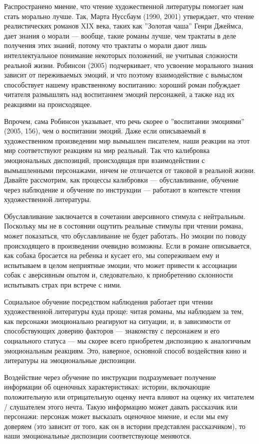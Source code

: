 \documentclass[11pt]{book}
\begin{document}
Распространено мнение, что чтение художественной литературы помогает нам стать морально лучше. Так, Марта Нуссбаум (1990, 2001) утверждает, что чтение реалистических романов XIX века, таких как ''Золотая чаша'' Генри Джеймса, дает знания о морали --- вообще, такие романы лучше, чем трактаты в деле получения этих знаний, потому что трактаты о морали дают лишь интеллектуальное понимание некоторых положений, не учитывая сложности реальной жизни. Робинсон (2005) подчеркивает, что усвоение морального знания зависит от переживаемых эмоций, и что поэтому взаимодействие с вымыслом способствует нашему нравственному воспитанию: хороший роман побуждает читателя размышлять над воспитанием эмоций персонажей, а также над их реакциями на происходящее.

Впрочем, сама Робинсон указывает, что речь скорее о ''воспитании эмоциями'' (2005, 156), чем о воспитании эмоций. Даже если описываемый в художественном произведении мир вымышлен писателем, наши реакции на этот мир соответствуют реакциям на мир реальный. Так что калибровка эмоциональных диспозиций, происходящая при взаимодействии с вымышленными персонажами, ничем не отличается от таковой в реальной жизни. Давайте рассмотрим, как процессы калибровки --- обуславливание, обучение через наблюдение и обучение по инструкции --- работают в контексте чтения художественной литературы.

Обуславливание заключается в сочетании аверсивного стимула с нейтральным. Поскольку мы не в состоянии ощутить реальные стимулы при чтении романа, может показаться, что обуславливание не будет работать. Но эмоции по поводу происходящего в произведении очевидно возможны. Если в романе описывается, как собака бросается на ребенка и кусает его, мы сопереживаем ему и испытываем в целом неприятные эмоции, что может привести к ассоциации собак с аверсивным опытом и, следовательно, к приобретению склонности испытывать страх при встрече с ними.

Социальное обучение посредством наблюдения работает при чтении художественной литературы куда проще: читая романы, мы наблюдаем за тем, как персонажи эмоционально реагируют  на ситуации, и, в зависимости от способствующих доверию факторов --- знакомству с персонажем и его социального статуса --- мы скорее всего приобретем диспозицию к аналогичным эмоциональным реакциям. Это, наверное, основной способ воздействия кино и литературы на эмоциональные диспозиции.

Воздействие через обучение по инструкции подразумевает получение информации об оценочных характеристиках: истории, включающие положительную или отрицательную оценку нечта влияют на оценку их читателем / слушателем этого нечта. Такую информацию может давать рассказчик или персонажи: персонаж может высказать оценочное мнение, и если мы ему доверяем (это зависит от того, как он в истории представлен рассказчиком), то наши эмоциональные диспозиции соответствующе меняются.
\end{document}
